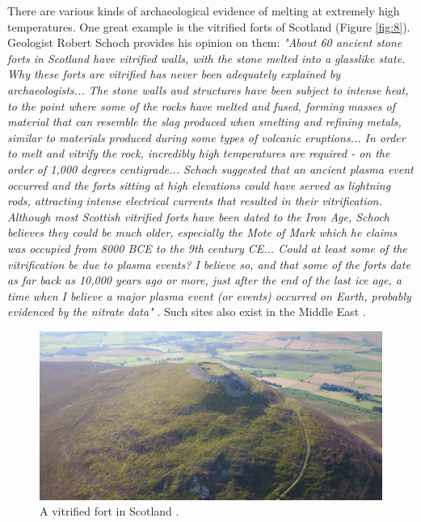 \documentclass[10pt,twocolumn,letterpaper]{article}
\begin{document}
There are various kinds of archaeological evidence of melting at extremely high temperatures. One great example is the vitrified forts of Scotland (Figure \ref{fig:8}). Geologist Robert Schoch provides his opinion on them: \textit{"About 60 ancient stone forts in Scotland have vitrified walls, with the stone melted into a glasslike state. Why these forts are vitrified has never been adequately explained by archaeologists... The stone walls and structures have been subject to intense heat, to the point where some of the rocks have melted and fused, forming masses of material that can resemble the slag produced when smelting and refining metals, similar to materials produced during some types of volcanic eruptions... In order to melt and vitrify the rock, incredibly high temperatures are required - on the order of 1,000 degrees centigrade... Schoch suggested that an ancient plasma event occurred and the forts sitting at high elevations could have served as lightning rods, attracting intense electrical currents that resulted in their vitrification. Although most Scottish vitrified forts have been dated to the Iron Age, Schoch believes they could be much older, especially the Mote of Mark which he claims was occupied from 8000 BCE to the 9th century CE... Could at least some of the vitrification be due to plasma events? I believe so, and that some of the forts date as far back as 10,000 years ago or more, just after the end of the last ice age, a time when I believe a major plasma event (or events) occurred on Earth, probably evidenced by the nitrate data"} \cite{18,19}. Such sites also exist in the Middle East \cite{20,21}.

\begin{figure}[t]
\begin{center}
   \includegraphics[width=1\linewidth]{vitrified.jpeg}
\end{center}
   \caption{A vitrified fort in Scotland \cite{51,52}.}
\label{fig:8}
\label{fig:onecol}
\end{figure}
\end{document}
